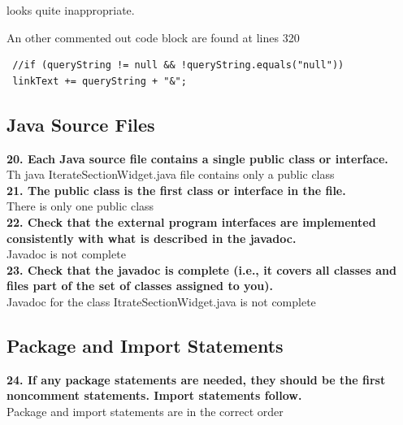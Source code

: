 \documentclass{article}
\begin{document}
\begin{flushleft}
\vspace{0.5cm}          
looks quite inappropriate.\\
\vspace{0.5cm}


An other commented out code block are found at lines 320\\
\vspace{0.5cm}
\begin{lstlisting}
 //if (queryString != null && !queryString.equals("null")) 
 linkText += queryString + "&"; 
\end{lstlisting}
\vspace{0.5cm}

\subsection{Java Source Files}
\textbf{20. Each Java source file contains a single public class or interface.}\\
\vspace{0.5cm}
Th java IterateSectionWidget.java file contains only a public class\\
\vspace{0.5cm}
\textbf{21. The public class is the first class or interface in the file.}\\
\vspace{0.5cm}
There is only one public class\\
\vspace{0.5cm}
\textbf{22. Check that the external program interfaces are implemented consistently with what is described in the javadoc.}\\
\vspace{0.5cm}
Javadoc is not complete\\
\vspace{0.5cm}
\textbf{23. Check that the javadoc is complete (i.e., it covers all classes and files part of the set of classes assigned to you).}\\
\vspace{0.5cm}
Javadoc for the class ItrateSectionWidget.java is not complete\\
\vspace{0.5cm}



\subsection{Package and Import Statements}
\textbf{24. If any package statements are needed, they should be the first noncomment statements. Import statements follow.}\\
\vspace{0.5cm}
Package and import statements are in the correct order\\
\vspace{0.5cm}



\end{flushleft}
\end{document}
